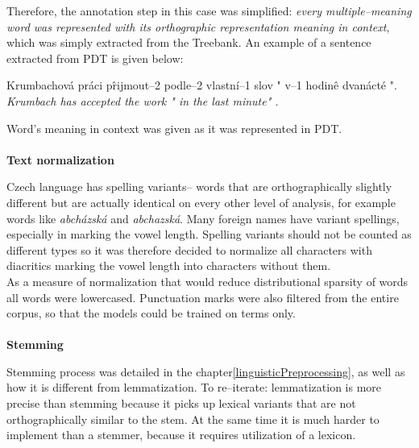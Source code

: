 Therefore, the annotation step in this case was simplified: \textit{every multiple--meaning word was 
represented with its orthographic representation meaning in context}, which was simply extracted from 
the Treebank. An example of a sentence extracted from PDT is given below:
\begin{examples}
\item Krumbachov\'a pr\'aci p\^rijmout--2 podle--2 vlastn\'i--1 slov " v--1 hodin\^e dvan\'act\'e ".
\glt \textit{ Krumbach has accepted the work " in the last minute" .} 
\end{examples}
Word's meaning in context was given as it was represented in PDT.
\\\\  \textbf{Text normalization}

Czech language has spelling variants-- words that are orthographically slightly different but are actually 
identical on every other level of analysis, for example words like \textit{abch\'azsk\'a}  and 
\textit{abchazsk\'a}. Many foreign names have variant spellings, especially in marking the vowel length. 
Spelling variants should not be counted as different types so it was therefore decided to normalize all 
characters with diacritics marking the vowel length into characters without them. 
\\As a measure of normalization that would reduce distributional sparsity of words all words were 
lowercased. Punctuation marks were also filtered from the entire corpus, so that the models could be 
trained on terms only. 
\\\\  \textbf{Stemming}

Stemming process was detailed in the chapter\ref{linguisticPreprocessing}, as well as how it is different 
from lemmatization. To re--iterate: lemmatization is more precise than stemming because it picks up 
lexical variants that are not orthographically similar to the stem. At the same time it is much harder to 
implement than a stemmer, because it requires utilization of a lexicon. 

